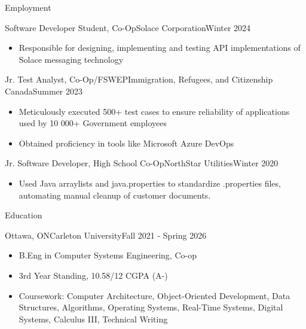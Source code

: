 \documentclass[]{mcdowellcv}
\begin{document}
	\begin{cvsection}{Employment}
		
	\begin{cvsubsection}{Software Developer Student, Co-Op}{Solace Corporation}{Winter 2024}			
		\begin{itemize}
		\item Responsible for designing, implementing and testing API implementations of Solace messaging technology
		\end{itemize}
	\end{cvsubsection}

		\begin{cvsubsection}{Jr. Test Analyst, Co-Op/FSWEP}{Immigration, Refugees, and Citizenship Canada}{Summer 2023}			
			\begin{itemize}
				\item Meticulously executed 500+ test cases to ensure reliability of applications used by 10 000+ Government employees
				\item Obtained proficiency in tools like Microsoft Azure DevOps 
			\end{itemize}
		\end{cvsubsection}
		
			\begin{cvsubsection}{Jr. Software Developer, High School Co-Op}{NorthStar Utilities}{Winter 2020}	
			\begin{itemize}
				\item Used Java arraylists and java.properties to standardize .properties files, automating manual cleanup of customer documents.
			\end{itemize}
		\end{cvsubsection}
	\end{cvsection}

	\begin{cvsection}{Education}
		\begin{cvsubsection}{Ottawa, ON}{Carleton University}{Fall 2021 - Spring 2026}
			\begin{itemize}
				\item B.Eng in Computer Systems Engineering, Co-op
				\item 3rd Year Standing, 10.58/12 CGPA (A-)
				\item Coursework: Computer Architecture, Object-Oriented Development, Data Structures, Algorithms, Operating Systems, Real-Time Systems, Digital Systems, Calculus III, Technical Writing
			\end{itemize}
		\end{cvsubsection}
	\end{cvsection}
	
\end{document}
